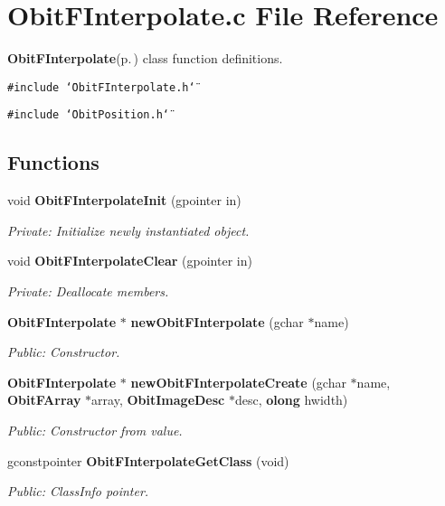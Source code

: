 \section{Obit\-FInterpolate.c File Reference}
\label{ObitFInterpolate_8c}
{\bf Obit\-FInterpolate}{\rm (p.\,\pageref{structObitFInterpolate})} class function definitions. 

{\tt \#include \char`\"{}Obit\-FInterpolate.h\char`\"{}}\par
{\tt \#include \char`\"{}Obit\-Position.h\char`\"{}}\par
\subsection*{Functions}
\begin{CompactItemize}
\item 
void {\bf Obit\-FInterpolate\-Init} (gpointer in)
\begin{CompactList}\small\item\em Private: Initialize newly instantiated object. \item\end{CompactList}\item 
void {\bf Obit\-FInterpolate\-Clear} (gpointer in)
\begin{CompactList}\small\item\em Private: Deallocate members. \item\end{CompactList}\item 
{\bf Obit\-FInterpolate} $\ast$ {\bf new\-Obit\-FInterpolate} (gchar $\ast$name)
\begin{CompactList}\small\item\em Public: Constructor. \item\end{CompactList}\item 
{\bf Obit\-FInterpolate} $\ast$ {\bf new\-Obit\-FInterpolate\-Create} (gchar $\ast$name, {\bf Obit\-FArray} $\ast$array, {\bf Obit\-Image\-Desc} $\ast$desc, {\bf olong} hwidth)
\begin{CompactList}\small\item\em Public: Constructor from value. \item\end{CompactList}\item 
gconstpointer {\bf Obit\-FInterpolate\-Get\-Class} (void)
\begin{CompactList}\small\item\em Public: Class\-Info pointer. \item\end{CompactList}\item 

\end{CompactItemize}
